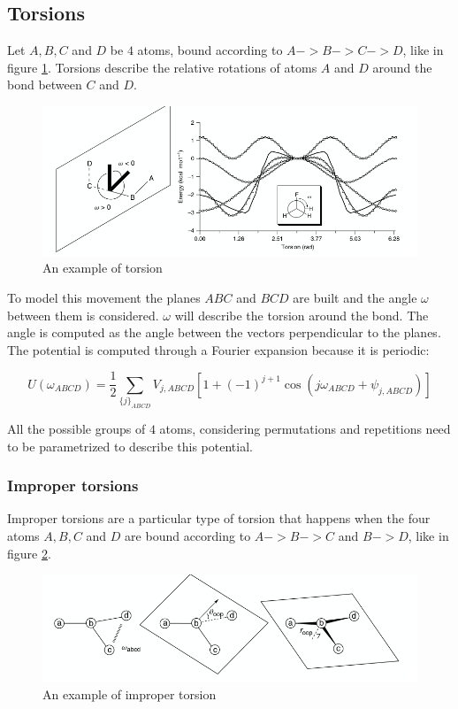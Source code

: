 	\subsection{Torsions}
	Let $A, B, C$ and $D$ be $4$ atoms, bound according to $A->B->C->D$, like in figure \ref{fig:torsions}.
	Torsions describe the relative rotations of atoms $A$ and $D$ around the bond between $C$ and $D$.

	\begin{figure}[H]
		\includegraphics[width=\textwidth]{torsions}
		\caption{An example of torsion}
		\label{fig:torsions}
	\end{figure}

	To model this movement the planes $ABC$ and $BCD$ are built and the angle $\omega$ between them is considered.
	$\omega$ will describe the torsion around the bond.
	The angle is computed as the angle between the vectors perpendicular to the planes.
	The potential is computed through a Fourier expansion because it is periodic:

	$$U(\omega_{ABCD}) = \frac{1}{2}\sum\limits_{\{j\}_{ABCD}}V_{j,ABCD}\left[1+(-1)^{j+1}\cos(j\omega_{ABCD}+\psi_{j,ABCD})\right]$$

	All the possible groups of $4$ atoms, considering permutations and repetitions need to be parametrized to describe this potential.

		\subsubsection{Improper torsions}
		Improper torsions are a particular type of torsion that happens when the four atoms $A, B, C$ and $D$ are bound according to $A->B->C$ and $B->D$, like in figure \ref{fig:improper-torsions}.

		\begin{figure}[H]
			\includegraphics[width=\textwidth]{improper-torsions}
			\caption{An example of improper torsion}
			\label{fig:improper-torsions}
		\end{figure}

